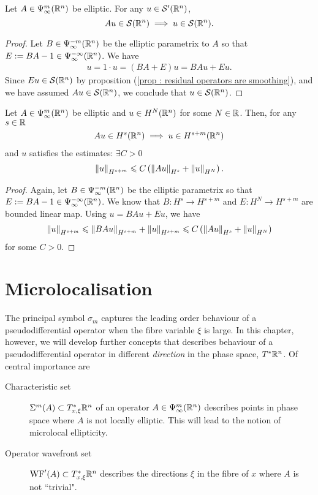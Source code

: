 \documentclass[12pt]{article}
\begin{document}
\begin{fprop}
    Let $A \in \Psi^{m}_{\infty}(\R^n)$  be  elliptic. For any $u \in \sch'(\R^n)$, 
    $$Au \in \sch(\R^n) \implies u \in \sch(\R^n). $$ 
\end{fprop}
\begin{proof}
    Let $B \in \Psi^{-m}_{\infty}(\R^n)$ be the elliptic parametrix to $A$ so that $E:= BA - 1 \in \Psi^{-\infty }_{\infty}(\R^n)$. We have
    \begin{align*}
    u = 1 \cdot u = (BA + E)u = BAu + Eu. 
    \end{align*}
    Since $Eu \in \sch(\R^n)$ by proposition (\ref{prop : residual operators are smoothing}), and  we have assumed $Au \in \sch(\R^n)$, we conclude that $u \in \sch(\R^n)$. 
    
\end{proof}

\begin{fprop}
    Let $A \in \Psi^{m}_{\infty}(\R^n)$ be elliptic and $u \in H^{N}(\R^n)$ for some $N \in \R$. Then, for any $s \in \R$
    \begin{align*}
    Au \in H^{s}(\R^n) \implies u \in H^{s + m}(\R^n)
    \end{align*}
    and $u$ satisfies the estimates: $\exists C > 0$
    \begin{align*}
    \norm[u]_{H^{s + m}} \leq C \brac{\norm[Au]_{H^s} + \norm[u]_{H^N}}. 
    \end{align*}
\end{fprop}
\begin{proof}
    Again, let $B \in \Psi^{-m}_{\infty}(\R^n)$ be the elliptic parametrix so that $E := BA - 1 \in \Psi^{-\infty}_{\infty}(\R^n)$. We know that $B : H^{s} \to H^{s + m}$ and  $E : H^N \to H^{s + m}$ are bounded linear map. Using $u = BAu + Eu$, we have
    \begin{align*}
     \norm[u]_{H^{s + m}} \leq \norm[BAu]_{H^{s + m}} + \norm[u]_{H^{s + m}} \leq C \brac{\norm[Au]_{H^s} + \norm[u]_{H^N}}
    \end{align*}
    for some $C > 0$. 
\end{proof}


\section{Microlocalisation}
The principal symbol $\sigma_m$ captures the leading order behaviour of a pseudodifferential operator when the fibre variable $\xi$ is large. In this chapter, however, we will develop further concepts that describes behaviour of a pseudodifferential operator in different \emph{direction} in the phase space, $T^*\R^n$. Of central importance are 
\begin{description}
    \item[Characteristic set] $\Char^m(A) \subset T^*_{x, \xi} \R^n$ of an operator $A \in \Psi^{m}_{\infty}(\R^n)$ describes points in phase space where $A$ is not locally elliptic. This will lead to the notion of microlocal ellipticity. 
    \item[Operator wavefront set] $\WF'(A) \subset T^*_{x, \xi} \R^n$ describes the directions $\xi$ in the fibre of $x$ where $A$ is not ``trivial". 
\end{description}
\end{document}
